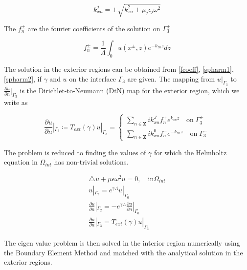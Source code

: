 \begin{equation} k_{xn}^j = \pm \sqrt{k_{zn}^2 + \mu_j \epsilon_j
\omega^2}
\end{equation}

The $f_n^\pm$ are the fourier coefficients of the solution on
$\Gamma_3^\pm$

\begin{equation}
f_n^\pm = \frac{1}{\Lambda}\int_0 u(x^\pm,z) e^{-k_{zn} z} dz
\label{fcoeff}
\end{equation}

The solution in the exterior regions can be obtained from
\ref{fcoeff}, \ref{spharm1}, \ref{spharm2}, if $\gamma$ and $u$ on the
interface $\Gamma_3$ are given. The mapping from $u|_{\Gamma_3}$ to
$\frac{\partial u}{\partial n} |_{\Gamma_3}$ is the
Dirichlet-to-Neumann (DtN) map for the exterior region, which we write
as

\begin{equation}
\frac{\partial u}{\partial n} |_{\Gamma_3} \coloneqq T_{ext}(\gamma)
u|_{\Gamma_3} = \left \{ \begin{array}{ll} \sum_{n \in \mathbf{Z}} i
k_{xn}^J f_n^+ e^{k_{zn}z} \quad \textrm{on} \; \Gamma_3^+ \\
\sum_{n \in \mathbf{Z}} ik_{xn}^0 f_n^- e^{-k_{zn}z} \quad
\textrm{on}\; \Gamma_3^- \end{array}\right .
\end{equation}

The problem is reduced to finding the values of $\gamma$ for which the
Helmholtz equation in $\Omega_{int}$ has non-trivial solutions.

\begin{equation}
\begin{array}{ll}
\triangle u + \mu \epsilon \omega^2 u = 0, \quad \textrm{in}
\Omega_{int} \\
u|_{\Gamma_2} = e^{\gamma \Lambda} u|_{\Gamma_0} \\
\frac{\partial u}{\partial n} |_{\Gamma_2} = -e^{\gamma \Lambda}
 \frac{\partial u}{\partial n} |_{\Gamma_0} \\
\frac{\partial u}{\partial n} |_{\Gamma_3} =  T_{ext}(\gamma) u|_{\Gamma_3}
\end{array}
\end{equation} 

 The eigen value
problem is then solved in the interior region numerically using the
Boundary Element Method and matched with the analytical solution in
the exterior regions.